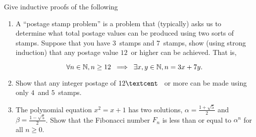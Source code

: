 
Give inductive proofs of the following 
\begin{enumerate}
\item A ``postage stamp problem'' is a problem that (typically) asks
us to determine what total postage values can be produced using two
sorts of stamps.  Suppose that you have $3$\cents\  stamps and $7$\cents\ 
stamps, show (using strong induction) that any postage value $12$\cents\ 
or higher can be achieved.  That is, 

\[ \forall n \in {\mathbb N}, n \geq 12 \; \implies \;
\exists x,y \in {\mathbb N} , n = 3x + 7y. \]
 
 \wbvfill

\workbookpagebreak

\item Show that any integer postage of $12 \cents$ or more can be made using
only $4$\cents\ and $5$\cents\ stamps.

\wbvfill


\item The polynomial equation $x^2 = x+1$ has two solutions, 
$\alpha = \frac{1+\sqrt{5}}{2}$ and $\beta = \frac{1-\sqrt{5}}{2}$.
Show that the Fibonacci number $F_n$ is less than or equal to $\alpha^{n}$
for all $n \geq 0$.

\wbvfill

\workbookpagebreak

\end{enumerate}



